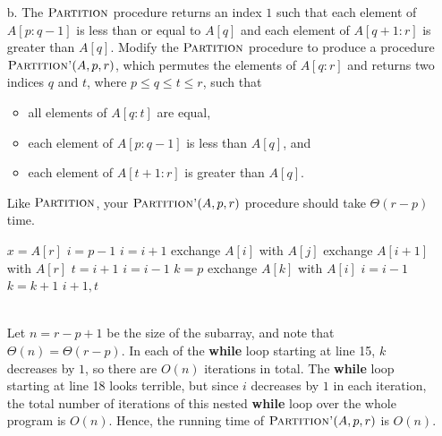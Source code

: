 \documentclass[12pt,reqno]{amsart}
\newif\ifanswer
\begin{document}
\begin{enumerate}[1.]
\begin{enumerate}
    \item[b.] The $\textsc{Partition}$ procedure returns an index $1$ such that each element of $A[p: q - 1]$ is less than or equal to $A[q]$ and each element of $A[q + 1: r]$ is greater than $A[q]$. Modify the $\textsc{Partition}$ procedure to produce a procedure $\textsc{Partition'}(A, p, r)$, which permutes the elements of $A[q: r]$ and returns two indices $q$ and $t$, where $p \leq q \leq t \leq r$, such that
    \begin{itemize}
        \item all elements of $A[q: t]$ are equal,
        \item each element of $A[p: q - 1]$ is less than $A[q]$, and
        \item each element of $A[t + 1: r]$ is greater than $A[q]$.
    \end{itemize}
    Like $\textsc{Partition}$, your $\textsc{Partition'}(A, p, r)$ procedure should take $\Theta(r - p)$ time.
    \ifanswer
    \noindent {\bf \\Solution}
    \begin{algorithm}
        \caption{$\textsc{Partition'}(A, p, r)$}
        \begin{algorithmic}[1]
            \STATE $x = A[r]$
            \STATE $i = p - 1$
                    \STATE $i = i + 1$
                    \STATE exchange $A[i]$ with $A[j]$
                \ENDIF
            \ENDFOR
            \STATE exchange $A[i + 1]$ with $A[r]$
            \STATE $t = i + 1$
                \STATE $i = i - 1$
            \ENDWHILE
            \STATE $k = p$
                    \STATE exchange $A[k]$ with $A[i]$
                        \STATE $i = i - 1$
                    \ENDWHILE
                \ENDIF
                \STATE $k = k + 1$
            \ENDWHILE
            \RETURN $i + 1, t$
        \end{algorithmic}
    \end{algorithm}
    \\Let $n = r - p + 1$ be the size of the subarray, and note that $\Theta(n) = \Theta(r - p)$. In each of the \textbf{while} loop starting at line 15, $k$ decreases by $1$, so there are $O(n)$ iterations in total. The \textbf{while} loop starting at line 18 looks terrible, but since $i$ decreases by $1$ in each iteration, the total number of iterations of this nested \textbf{while} loop over the whole program is $O(n)$. Hence, the running time of $\textsc{Partition'}(A, p, r)$ is $O(n)$.
    

\end{enumerate}
\end{enumerate}
\end{document}
